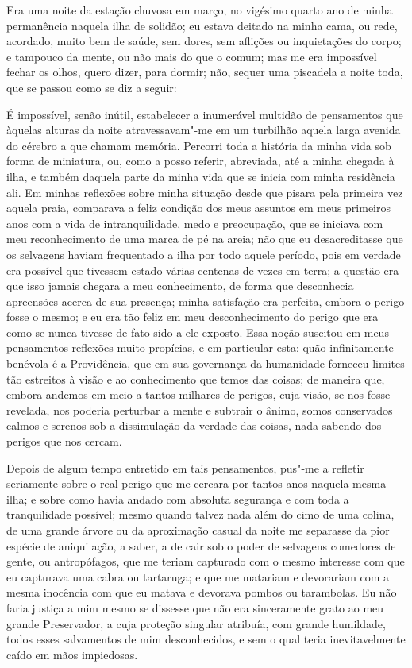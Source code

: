 Era uma noite da estação chuvosa em março, no vigésimo quarto ano de
minha permanência naquela ilha de solidão; eu estava deitado na minha
cama, ou rede, acordado, muito bem de saúde, sem dores, sem aflições ou
inquietações do corpo; e tampouco da mente, ou não mais do que o comum;
mas me era impossível fechar os olhos, quero dizer, para dormir; não,
sequer uma piscadela a noite toda, que se passou como se diz a seguir:

É impossível, senão inútil, estabelecer a inumerável multidão de
pensamentos que àquelas alturas da noite atravessavam"-me em um turbilhão
aquela larga avenida do cérebro a que chamam memória. Percorri toda a
história da minha vida sob forma de miniatura, ou, como a posso referir,
abreviada, até a minha chegada à ilha, e também daquela parte da minha
vida que se inicia com minha residência ali. Em minhas reflexões sobre
minha situação desde que pisara pela primeira vez aquela praia,
comparava a feliz condição dos meus assuntos em meus primeiros anos com
a vida de intranquilidade, medo e preocupação, que se iniciava com meu
reconhecimento de uma marca de pé na areia; não que eu desacreditasse
que os selvagens haviam frequentado a ilha por todo aquele período, pois
em verdade era possível que tivessem estado várias centenas de vezes em
terra; a questão era que isso jamais chegara a meu conhecimento, de
forma que desconhecia apreensões acerca de sua presença; minha
satisfação era perfeita, embora o perigo fosse o mesmo; e eu era tão
feliz em meu desconhecimento do perigo que era como se nunca tivesse de
fato sido a ele exposto. Essa noção suscitou em meus pensamentos
reflexões muito propícias, e em particular esta: quão infinitamente
benévola é a Providência, que em sua governança da humanidade forneceu
limites tão estreitos à visão e ao conhecimento que temos das coisas; de
maneira que, embora andemos em meio a tantos milhares de perigos, cuja
visão, se nos fosse revelada, nos poderia perturbar a mente e subtrair o
ânimo, somos conservados calmos e serenos sob a dissimulação da verdade
das coisas, nada sabendo dos perigos que nos cercam.

Depois de algum tempo entretido em tais pensamentos, pus"-me a refletir
seriamente sobre o real perigo que me cercara por tantos anos naquela
mesma ilha; e sobre como havia andado com absoluta segurança e com toda
a tranquilidade possível; mesmo quando talvez nada além do cimo de uma
colina, de uma grande árvore ou da aproximação casual da noite me
separasse da pior espécie de aniquilação, a saber, a de cair sob o poder
de selvagens comedores de gente, ou antropófagos, que me teriam
capturado com o mesmo interesse com que eu capturava uma cabra ou
tartaruga; e que me matariam e devorariam com a mesma inocência com que
eu matava e devorava pombos ou tarambolas. Eu não faria justiça a mim
mesmo se dissesse que não era sinceramente grato ao meu grande
Preservador, a cuja proteção singular atribuía, com grande humildade,
todos esses salvamentos de mim desconhecidos, e sem o qual teria
inevitavelmente caído em mãos impiedosas.

